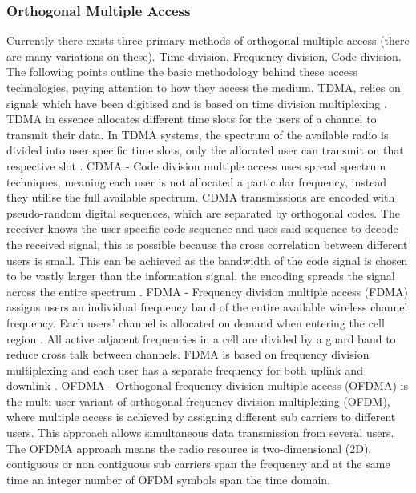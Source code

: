 \documentclass{article}
\begin{document}
\subsubsection{Orthogonal Multiple Access}
Currently there exists three primary methods of orthogonal multiple access (there are many variations on these). Time-division, Frequency-division, Code-division. The following points outline the basic methodology behind these access technologies, paying attention to how they access the medium. \ac{TDMA},  relies on signals which have been digitised and is based on time division multiplexing \cite{tdma_info}. TDMA in essence allocates different time slots for the users of a channel to transmit their data. In TDMA systems, the spectrum of the available radio is divided into user specific time slots, only the allocated user can transmit on that respective slot \cite{tdma_info}.
CDMA - Code division multiple access uses spread spectrum techniques, meaning each user is not allocated a particular frequency, instead they utilise the full available spectrum. CDMA transmissions are encoded with pseudo-random digital sequences, which are separated by orthogonal codes\cite{cdma_info}. The receiver knows the user specific code sequence and uses said sequence to decode the received signal, this is possible because the cross correlation between different users is small. This can be achieved as the bandwidth of the code signal is chosen to be vastly larger than the information signal, the encoding spreads the signal across the entire spectrum \cite{cdma_info}.
FDMA - Frequency division multiple access (FDMA) assigns users an individual frequency band of the entire available wireless channel frequency. Each users' channel is allocated on demand when entering the cell region \cite[Section...]{fdma_info}. All active adjacent frequencies in a cell are divided by a guard band to reduce cross talk between channels. FDMA is based on frequency division multiplexing and each user has a separate frequency for both uplink and downlink \cite{fdma_info}. OFDMA - Orthogonal frequency division multiple access (OFDMA) is the multi user variant of orthogonal frequency division multiplexing (OFDM), where multiple access is achieved by assigning different sub carriers to different users. This approach allows simultaneous data transmission from several users. The OFDMA approach means the radio resource is two-dimensional (2D), contiguous or non contiguous sub carriers span the frequency and at the same time an integer number of OFDM symbols span the time domain\cite{ofdma_info}.
\end{document}
